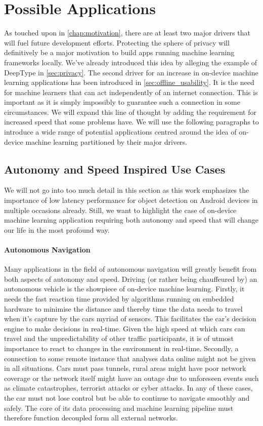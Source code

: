 \documentclass[
			   fontsize=11pt,
               paper=a4,
               bibliography=totoc,
               idxtotoc,
               headsepline,
               footsepline,
               footinclude=false,
               BCOR=12mm,
               DIV=13,
               openany,   %
               ]
               {scrbook}
\begin{document}
\section{Possible Applications}

As touched upon in \autoref{chap:motivation}, there are at least two major drivers that will fuel future development efforts. Protecting the sphere of privacy will definitively be a major motivation to build apps running machine learning frameworks locally. We've already introduced this idea by alleging the example of DeepType in \autoref{sec:privacy}. The second driver for an increase in on-device machine learning applications has been introduced in \autoref{sec:offline_usability}. It is the need for machine learners that can act independently of an internet connection. This is important as it is simply impossibly to guarantee such a connection in some circumstances. We will expand this line of thought by adding the requirement for increased speed that some problems have. We will use the following paragraphs to introduce a wide range of potential applications centred around the idea of on-device machine learning partitioned by their major drivers.

\subsection{Autonomy and Speed Inspired Use Cases}

We will not go into too much detail in this section as this work emphasizes the importance of low latency performance for object detection on Android devices in multiple occasions already. Still, we want to highlight the case of on-device machine learning application requiring both autonomy and speed that will change our life in the most profound way.

\paragraph{Autonomous Navigation}
Many applications in the field of autonomous navigation will greatly benefit from both aspects of autonomy and speed. Driving (or rather being chauffeured by) an autonomous vehicle is the showpiece of on-device machine learning. Firstly, it needs the fast reaction time provided by algorithms running on embedded hardware to minimise the distance and thereby time the data needs to travel when it's capture by the cars myriad of sensors. This facilitates the car's decision engine to make decisions in real-time. Given the high speed at which cars can travel and the unpredictability of other traffic participants, it is of utmost importance to react to changes in the environment in real-time. Secondly, a connection to some remote instance that analyses data online might not be given in all situations. Cars must pass tunnels, rural areas might have poor network coverage or the network itself might have an outage due to unforeseen events such as climate catastrophes, terrorist attacks or cyber attacks. In any of these cases, the car must not lose control but be able to continue to navigate smoothly and safely. The core of its data processing and machine learning pipeline must therefore function decoupled form all external networks.
\end{document}
